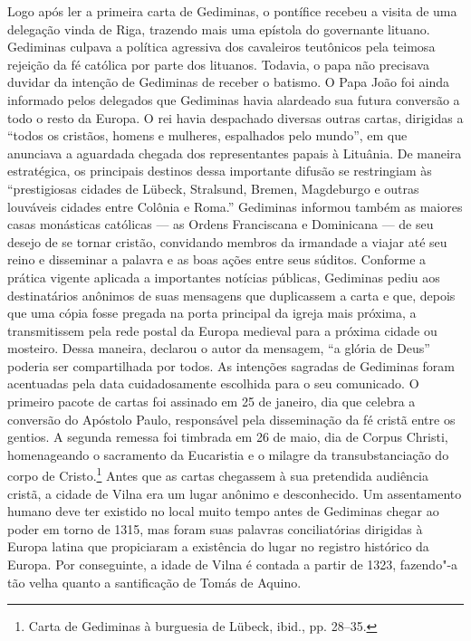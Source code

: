 Logo após ler a primeira carta de Gediminas, o pontífice recebeu a
visita de uma delegação vinda de Riga, trazendo mais uma epístola do
governante lituano. Gediminas culpava a política agressiva dos
cavaleiros teutônicos pela teimosa rejeição da fé católica por parte dos
lituanos. Todavia, o papa não precisava duvidar da intenção de Gediminas
de receber o batismo. O Papa João  foi ainda informado pelos
delegados que Gediminas havia alardeado sua futura conversão a todo o
resto da Europa. O rei havia despachado diversas outras cartas,
dirigidas a ``todos os cristãos, homens e mulheres, espalhados pelo
mundo'', em que anunciava a aguardada chegada dos representantes papais
à Lituânia. De maneira estratégica, os principais destinos dessa
importante difusão se restringiam às ``prestigiosas cidades de Lübeck,
Stralsund, Bremen, Magdeburgo e outras louváveis cidades entre Colônia e
Roma.'' Gediminas informou também as maiores casas monásticas católicas
--- as Ordens Franciscana e Dominicana --- de seu desejo de se tornar
cristão, convidando membros da irmandade a viajar até seu reino e
disseminar a palavra e as boas ações entre seus súditos. Conforme a
prática vigente aplicada a importantes notícias públicas, Gediminas
pediu aos destinatários anônimos de suas mensagens que duplicassem a
carta e que, depois que uma cópia fosse pregada na porta principal da
igreja mais próxima, a transmitissem pela rede postal da Europa medieval
para a próxima cidade ou mosteiro. Dessa maneira, declarou o autor da
mensagem, ``a glória de Deus'' poderia ser compartilhada por todos. As
intenções sagradas de Gediminas foram acentuadas pela data
cuidadosamente escolhida para o seu comunicado. O primeiro pacote de
cartas foi assinado em 25 de janeiro, dia que celebra a conversão do
Apóstolo Paulo, responsável pela disseminação da fé cristã entre os
gentios. A segunda remessa foi timbrada em 26 de maio, dia de
Corpus Christi, homenageando o sacramento da Eucaristia e o
milagre da transubstanciação do corpo de Cristo.\footnote{Carta de Gediminas à burguesia de Lübeck, ibid., pp. 28--35.}
Antes que as cartas chegassem à sua pretendida audiência cristã, a
cidade de Vilna era um lugar anônimo e desconhecido. Um assentamento
humano deve ter existido no local muito tempo antes de Gediminas chegar
ao poder em torno de 1315, mas foram suas palavras conciliatórias
dirigidas à Europa latina que propiciaram a existência do lugar no
registro histórico da Europa. Por conseguinte, a idade de Vilna é
contada a partir de 1323, fazendo"-a tão velha quanto a santificação de
Tomás de Aquino.

